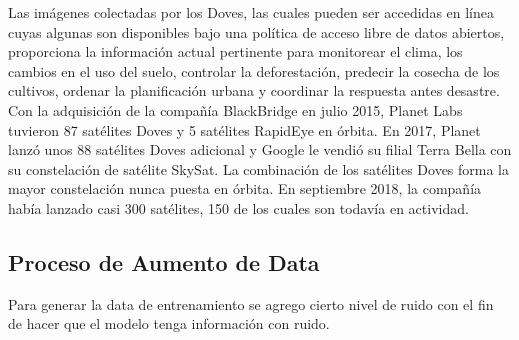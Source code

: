 Las imágenes colectadas por los Doves, las cuales pueden ser accedidas en línea cuyas algunas son disponibles bajo una política de acceso libre de datos abiertos, proporciona la información actual pertinente para monitorear el clima, los cambios en el uso del suelo, controlar la deforestación, predecir la cosecha de los cultivos, ordenar la planificación urbana y coordinar la respuesta antes desastre. Con la adquisición de la compañía BlackBridge en julio 2015, Planet Labs tuvieron 87 satélites Doves y 5 satélites RapidEye en órbita. En 2017, Planet lanzó unos 88 satélites Doves adicional y Google le vendió su filial Terra Bella con su constelación de satélite SkySat. La combinación de los satélites Doves forma la mayor constelación nunca puesta en órbita. En septiembre 2018, la compañía había lanzado casi 300 satélites, 150 de los cuales son todavía en actividad.


\subsection{Proceso de Aumento de Data}
Para generar la data de entrenamiento se agrego cierto nivel de ruido con el fin de hacer que el modelo tenga información con ruido.




